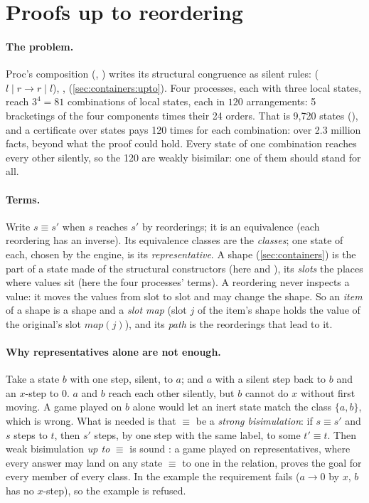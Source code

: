 \section{Proofs up to reordering}\label{sec:upto}

\paragraph{The problem.} Proc's composition (,
) writes its structural congruence as silent rules:
 ($l \mid r \to r \mid l$), ,
 (\cref{sec:containers:upto}). Four processes, each with
three local states, reach $3^4 = 81$ combinations of local states, each
in $120$ arrangements: 5 bracketings of the four components times their
24 orders. That is 9,720 states (),
and a certificate over states pays 120 times for each combination: over
2.3 million facts, beyond what the proof could hold. Every state of one
combination reaches every other silently, so the 120 are weakly
bisimilar: one of them should stand for all.

\paragraph{Terms.} Write $s \equiv s'$ when $s$ reaches $s'$ by
reorderings; it is an equivalence (each reordering has an inverse). Its
equivalence classes are the \emph{classes}; one state of each, chosen by
the engine, is its \emph{representative}. A shape (\cref{sec:containers})
is the part of a state made of the structural constructors (here
 and ), its \emph{slots} the places where values sit
(here the four processes' terms). A reordering never inspects a value: it
moves the values from slot to slot and may change the shape. So an
\emph{item} of a shape is a shape and a \emph{slot map} (slot $j$ of the
item's shape holds the value of the original's slot $\mathit{map}(j)$),
and its \emph{path} is the reorderings that lead to it.

\paragraph{Why representatives alone are not enough.} Take a state $b$
with one step, silent, to $a$; and $a$ with a silent step back to $b$ and
an $x$-step to $0$. $a$ and $b$ reach each other silently, but $b$ cannot
do $x$ without first moving. A game played on $b$ alone would let an
inert state match the class $\{a, b\}$, which is wrong. What is needed is
that $\equiv$ be a \emph{strong bisimulation}: if $s \equiv s'$ and $s$
steps to $t$, then $s'$ steps, by one step with the same label, to some
$t' \equiv t$. Then weak bisimulation \emph{up to} $\equiv$ is sound
\citep{milner89,pous-sangiorgi11,sangiorgi11}: a game played on
representatives, where every answer may land on any state $\equiv$ to one
in the relation, proves the goal for every member of every class. In the
example the requirement fails ($a \to 0$ by $x$, $b$ has no $x$-step), so
the example is refused.

